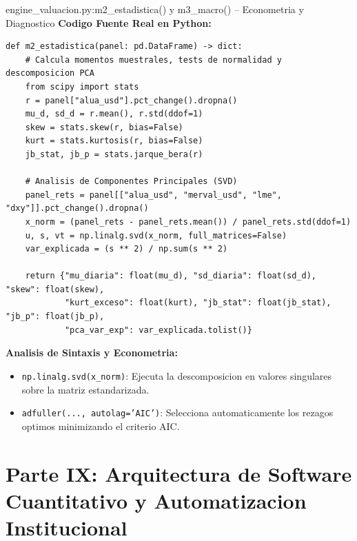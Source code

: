 \documentclass[10pt,a4paper]{article}
\theoremstyle{definition}
\begin{document}
\begin{codebox}{{engine\_valuacion.py:m2\_estadistica() y m3\_macro() -- Econometria y Diagnostico}}
\textbf{Codigo Fuente Real en Python:}
\begin{verbatim}
def m2_estadistica(panel: pd.DataFrame) -> dict:
    # Calcula momentos muestrales, tests de normalidad y descomposicion PCA
    from scipy import stats
    r = panel["alua_usd"].pct_change().dropna()
    mu_d, sd_d = r.mean(), r.std(ddof=1)
    skew = stats.skew(r, bias=False)
    kurt = stats.kurtosis(r, bias=False)
    jb_stat, jb_p = stats.jarque_bera(r)
    
    # Analisis de Componentes Principales (SVD)
    panel_rets = panel[["alua_usd", "merval_usd", "lme", "dxy"]].pct_change().dropna()
    x_norm = (panel_rets - panel_rets.mean()) / panel_rets.std(ddof=1)
    u, s, vt = np.linalg.svd(x_norm, full_matrices=False)
    var_explicada = (s ** 2) / np.sum(s ** 2)
    
    return {"mu_diaria": float(mu_d), "sd_diaria": float(sd_d), "skew": float(skew),
            "kurt_exceso": float(kurt), "jb_stat": float(jb_stat), "jb_p": float(jb_p),
            "pca_var_exp": var_explicada.tolist()}
\end{verbatim}
\textbf{Analisis de Sintaxis y Econometria:}
\begin{itemize}
    \item \texttt{np.linalg.svd(x\_norm)}: Ejecuta la descomposicion en valores singulares sobre la matriz estandarizada.
    \item \texttt{adfuller(..., autolag='AIC')}: Selecciona automaticamente los rezagos optimos minimizando el criterio AIC.
\end{itemize}
\end{codebox}
\clearpage


\section{Parte IX: Arquitectura de Software Cuantitativo y Automatizacion Institucional}
\end{document}
